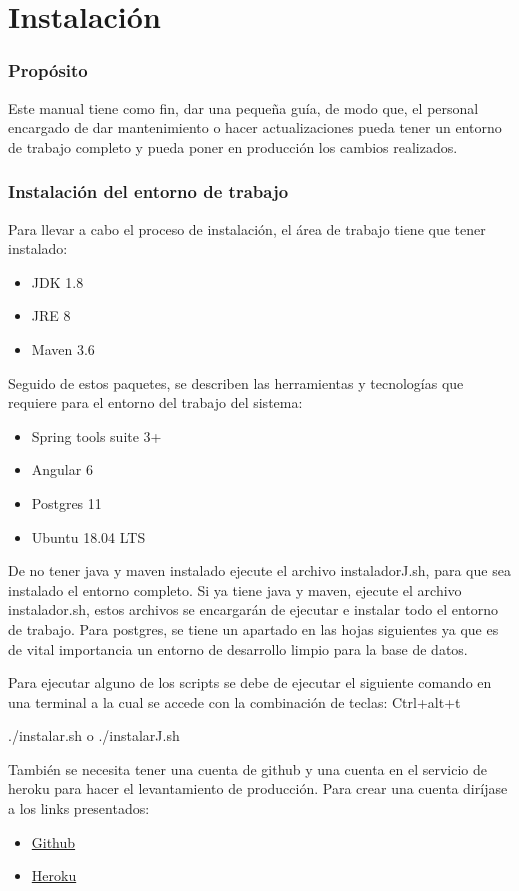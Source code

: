 \chapter{Instalación}

\subsection{Propósito}
Este manual tiene como fin, dar una pequeña guía, de modo que, el personal encargado de dar mantenimiento o hacer actualizaciones pueda tener un entorno de trabajo completo y pueda poner en producción los cambios realizados.

\subsection{Instalación del entorno de trabajo}
Para llevar a cabo el proceso de instalación, el área de trabajo tiene que tener instalado:
\begin{itemize}
  \item JDK 1.8
  \item JRE 8
  \item Maven 3.6
\end{itemize}

Seguido de estos paquetes, se describen las herramientas y tecnologías que requiere para el entorno del trabajo del sistema:
\begin{itemize}
  \item Spring tools suite 3+
  \item Angular 6
  \item Postgres 11
  \item Ubuntu 18.04 LTS
\end{itemize}
De no tener java y maven instalado ejecute el archivo instaladorJ.sh, para que sea instalado el entorno completo.
Si ya tiene java y maven, ejecute el archivo instalador.sh, estos archivos se encargarán de ejecutar e instalar todo el entorno de trabajo.
Para postgres, se tiene un apartado en las hojas siguientes ya que es de vital importancia un entorno de desarrollo limpio para la base de datos.

Para ejecutar alguno de los scripts se debe de ejecutar el siguiente comando en una terminal a la cual se accede con la combinación de teclas: Ctrl+alt+t

./instalar.sh 
o
./instalarJ.sh

También se necesita tener una cuenta de github y una cuenta en el servicio de heroku para hacer el levantamiento de producción. Para crear una cuenta diríjase a los links presentados:
\begin{itemize}
  \item \href{htt://codigofacilito.com/articulos/como-crear-una-cuenta-y-un-repo-en-github}{Github}
  \item \href{https://signup.heroku.com/dc}{Heroku}
\end{itemize}
